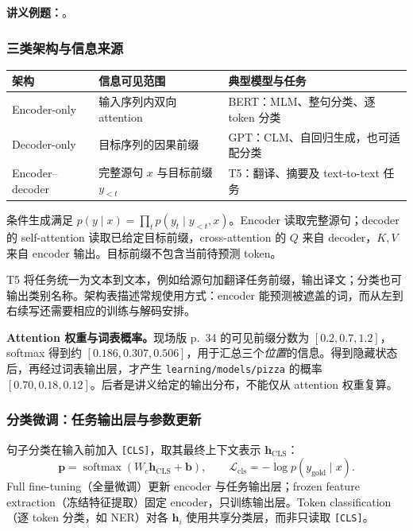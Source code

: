 \textbf{讲义例题：}。

\subsubsection{三类架构与信息来源}

\begin{center}
\small
\begin{tabularx}{\textwidth}{@{}lXX@{}}
\toprule
架构 & 信息可见范围 & 典型模型与任务 \\
\midrule
Encoder-only & 输入序列内双向 attention & BERT：MLM、整句分类、逐 token 分类 \\
Decoder-only & 目标序列的因果前缀 & GPT：CLM、自回归生成，也可适配分类 \\
Encoder--decoder & 完整源句 $x$ 与目标前缀 $y_{<t}$ & T5：翻译、摘要及 text-to-text 任务 \\
\bottomrule
\end{tabularx}
\end{center}

条件生成满足 $p(y\mid x)=\prod_t p(y_t\mid y_{<t},x)$。Encoder 读取完整源句；decoder 的 self-attention 读取已给定目标前缀，cross-attention 的 $Q$ 来自 decoder，$K,V$ 来自 encoder 输出。目标前缀不包含当前待预测 token。

T5 将任务统一为文本到文本，例如给源句加翻译任务前缀，输出译文；分类也可输出类别名称。架构表描述常规使用方式：encoder 能预测被遮盖的词，而从左到右续写还需要相应的训练与解码安排。

\textbf{Attention 权重与词表概率。}现场版 p.~34 的可见前缀分数为 $[0.2,0.7,1.2]$，softmax 得到约 $[0.186,0.307,0.506]$，用于汇总三个\emph{位置}的信息。得到隐藏状态后，再经过词表输出层，才产生 \texttt{learning/models/pizza} 的概率 $[0.70,0.18,0.12]$。后者是讲义给定的输出分布，不能仅从 attention 权重复算。

\subsubsection{分类微调：任务输出层与参数更新}

句子分类在输入前加入 \texttt{[CLS]}，取其最终上下文表示 $\mathbf h_{\mathrm{CLS}}$：
\[
 \mathbf p=\operatorname{softmax}(W_c\mathbf h_{\mathrm{CLS}}+\mathbf b),
 \qquad \mathcal L_{\mathrm{cls}}=-\log p(y_{\mathrm{gold}}\mid x).
\]
Full fine-tuning（全量微调）更新 encoder 与任务输出层；frozen feature extraction（冻结特征提取）固定 encoder，只训练输出层。Token classification（逐 token 分类，如 NER）对各 $\mathbf h_i$ 使用共享分类层，而非只读取 \texttt{[CLS]}。

